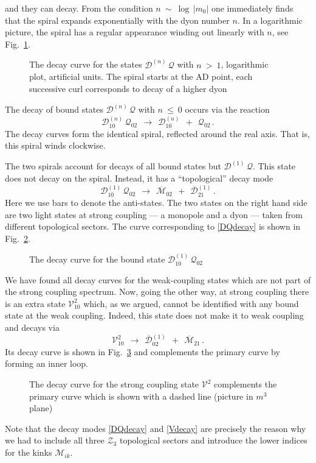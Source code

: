 \documentclass[epsfig,12pt]{article}
\def\beq{\begin{equation}}
\def\eeq{\end{equation}}
\def\beq{\begin{equation}}
\def\eeq{\end{equation}}
\newcommand{\ov}{\overline}
\newcommand{\mc}[1]{\mathcal{#1}}
\newcommand{\M}{\mathcal{M}}
\newcommand{\bM}{\ov{\mathcal{M}}{}}
\newcommand{\Q}{\mathcal{Q}}
\newcommand{\D}{\mathcal{D}}
\newcommand{\V}{\mathcal{V}}
\begin{document}
	and they can decay.
	From the condition $ n ~\sim~ \log\, | m_0 | $ one immediately finds that the spiral expands exponentially 
	with the dyon number $ n $.
	In a logarithmic picture, the spiral has a regular appearance winding out linearly with $ n $, see Fig.~\ref{flinspiral}.
\begin{figure}
\begin{center}
\epsfxsize=7.5cm
\caption{\small The decay curve for the states $ \D^{(n)}\,\Q $ with $ n ~>~ 1 $, logarithmic plot, artificial units. 
		The spiral starts at the AD point,
		each successive curl corresponds to decay of a higher dyon}
\label{flinspiral}
\end{center}
\end{figure}

	The decay of bound states $ \D^{(n)}\,\Q $ with $ n ~\leq~ 0 $ occurs via the reaction
\beq
	\D_{10}^{(n)}\,\Q_{02}  ~~\longrightarrow~~  \D_{10}^{(n)}  ~~+~~  \Q_{02}\,.
\eeq
	The decay curves form the identical spiral, reflected around the real axis.
	That is, this spiral winds clockwise.

	The two spirals account for decays of all bound states but $ \D^{(1)}\,\Q $.
	This state does not decay on the spiral.
	Instead, it has a ``topological'' decay mode
\beq
\label{DQdecay}
	\D_{10}^{(1)}\,\Q_{02}  ~~\longrightarrow~~  \bM_{02}  ~~+~~  \ov{\D}{}_{21}^{(1)}\,.
\eeq
	Here we use bars to denote the anti-states.
	The two states on the right hand side are two light states at strong coupling
	--- a monopole and a dyon --- taken from different topological sectors.
	The curve corresponding to \eqref{DQdecay} is shown in Fig.~\ref{fddecay}.
\begin{figure}
\begin{center}
\epsfxsize=7.5cm
\caption{\small The decay curve for the bound state $ \D_{10}^{(1)}\,\Q_{02} $}
\label{fddecay}
\end{center}
\end{figure}

	We have found all decay curves for the weak-coupling states which are not part of the strong coupling spectrum.
	Now, going the other way, at strong coupling there is an extra state $ \V_{10}^2 $ which, 
	as we argued, cannot be identified with any bound state at the weak coupling.
	Indeed, this state does not make it to weak coupling and decays via
\beq
\label{Vdecay}
	\V_{10}^2  ~~\longrightarrow~~  \ov{\D}{}_{02}^{(1)}  ~~+~~  \bM_{21}\,.
\eeq
	Its decay curve is shown in Fig.~\ref{fvdecay} and complements the primary curve by forming an inner loop.
\begin{figure}
\begin{center}
\epsfxsize=7.5cm
\caption{\small The decay curve for the strong coupling state $ \V^2 $ complements the primary curve
		which is shown with a dashed line (picture in $ m^3 $ plane)}
\label{fvdecay}
\end{center}
\end{figure}
	Note that the decay modes \eqref{DQdecay} and \eqref{Vdecay} are precisely the reason why we had to include all
	three $ \mc{Z}_3 $ topological sectors and introduce the lower indices for the kinks $ \M_{ik} $.
\end{document}
